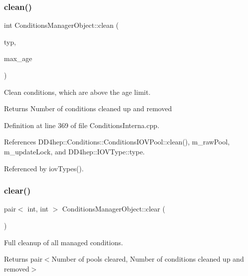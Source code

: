 \subsubsection{\texorpdfstring{clean()}{clean()}}
{\footnotesize\ttfamily int Conditions\+Manager\+Object\+::clean (\begin{DoxyParamCaption}\item[{const \hyperlink{class_d_d4hep_1_1_i_o_v_type}{I\+O\+V\+Type} $\ast$}]{typ,  }\item[{int}]{max\+\_\+age }\end{DoxyParamCaption})}



Clean conditions, which are above the age limit. 

\begin{DoxyReturn}{Returns}
Number of conditions cleaned up and removed 
\end{DoxyReturn}


Definition at line 369 of file Conditions\+Interna.\+cpp.



References D\+D4hep\+::\+Conditions\+::\+Conditions\+I\+O\+V\+Pool\+::clean(), m\+\_\+raw\+Pool, m\+\_\+update\+Lock, and D\+D4hep\+::\+I\+O\+V\+Type\+::type.



Referenced by iov\+Types().

\hypertarget{class_d_d4hep_1_1_conditions_1_1_conditions_manager_object_a16cf2685ed249700904621d9a68bcdb2}{}\label{class_d_d4hep_1_1_conditions_1_1_conditions_manager_object_a16cf2685ed249700904621d9a68bcdb2} 
\subsubsection{\texorpdfstring{clear()}{clear()}}
{\footnotesize\ttfamily pair$<$ int, int $>$ Conditions\+Manager\+Object\+::clear (\begin{DoxyParamCaption}{ }\end{DoxyParamCaption})}



Full cleanup of all managed conditions. 

\begin{DoxyReturn}{Returns}
pair$<$\+Number of pools cleared, Number of conditions cleaned up and removed$>$ 
\end{DoxyReturn}


